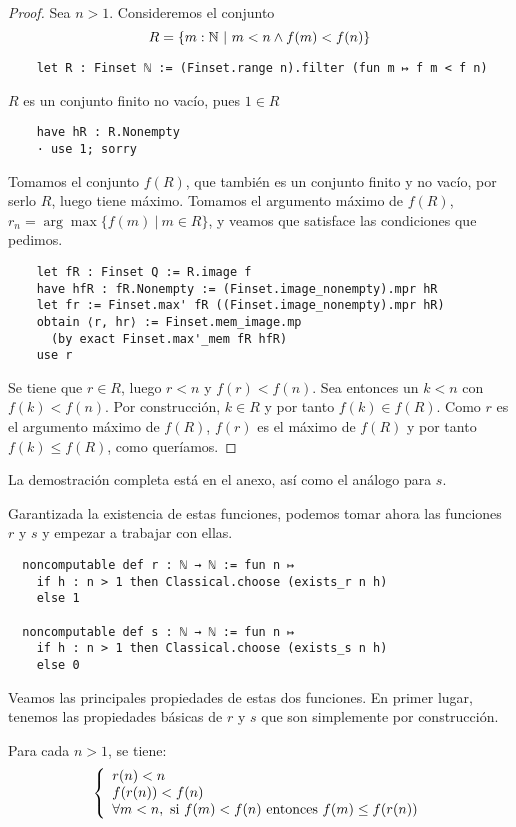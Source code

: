 \begin{proof}
  Sea $n>1$. Consideremos el conjunto
  $$
  R = \{m : \mathbb{N} ~|~ m < n \land f(m) < f(n)\}
  $$
  \begin{lstlisting}
    let R : Finset ℕ := (Finset.range n).filter (fun m ↦ f m < f n) \end{lstlisting}
  $R$ es un conjunto finito no vacío, pues $1 \in R$
  \begin{lstlisting}
    have hR : R.Nonempty
    · use 1; sorry \end{lstlisting}

  Tomamos el conjunto $f(R)$, que también es un conjunto finito y no vacío, por serlo $R$, luego tiene máximo. Tomamos el argumento máximo de $f(R)$, $r_n = \arg \max \{f(m) ~|~ m \in R\}$, y veamos que satisface las condiciones que pedimos.

  \begin{lstlisting}
    let fR : Finset Q := R.image f
    have hfR : fR.Nonempty := (Finset.image_nonempty).mpr hR
    let fr := Finset.max' fR ((Finset.image_nonempty).mpr hR)
    obtain ⟨r, hr⟩ := Finset.mem_image.mp
      (by exact Finset.max'_mem fR hfR)
    use r \end{lstlisting}

  Se tiene que $r \in R$, luego $r < n$ y $f(r) < f(n)$. Sea entonces un $k < n$ con $f(k) < f(n)$. Por construcción, $k \in R$ y por tanto $f(k) \in f(R)$. Como $r$ es el argumento máximo de $f(R)$, $f(r)$ es el máximo de $f(R)$ y por tanto $f(k) \leq f(R)$, como queríamos.
\end{proof}

La demostración completa está en el anexo, así como el análogo para $s$.

Garantizada la existencia de estas funciones, podemos tomar ahora las funciones $r$ y $s$ y empezar a trabajar con ellas.

\begin{lstlisting}
  noncomputable def r : ℕ → ℕ := fun n ↦
    if h : n > 1 then Classical.choose (exists_r n h)
    else 1

  noncomputable def s : ℕ → ℕ := fun n ↦
    if h : n > 1 then Classical.choose (exists_s n h)
    else 0
\end{lstlisting}

Veamos las principales propiedades de estas dos funciones. En primer lugar, tenemos las propiedades básicas de $r$ y $s$ que son simplemente por construcción.

\begin{lemma}
  Para cada $n > 1$, se tiene:
  $$
  \left\{
    \begin{array}{l}
      r(n) < n \\
      f(r(n)) < f (n) \\
      \forall m < n, \textnormal{ si } f(m) < f(n) \textnormal{ entonces } f(m) \leq f(r(n))
    \end{array}
  \right.
  $$
\end{lemma}

